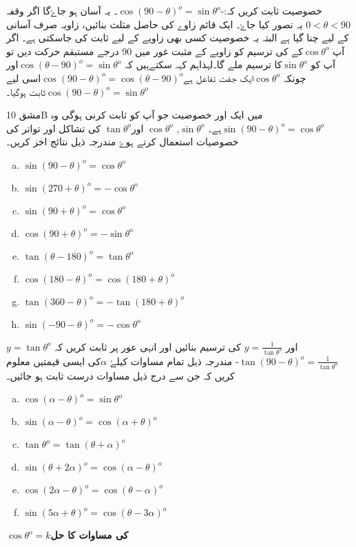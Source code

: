 خصوصیت ثابت کریں کہ:-\( \cos (90- \theta)^o=\sin \theta^o\)۔
یہ آسان ہو جاۓگا اگر وقفہ\(0<\theta <90\) یہ تصور کیا جاۓ۔ ایک قائم زاوے کی حاصل مثلث بنائیں، زاویہ صرف آسانی کے لیے چنا گیا ہے البتہ یہ خصوصیت کسی بھی زاویے کے لیے ثابت کی جاسکتی ہے۔
اگر آپ \(\cos \theta^o\)کے کی ترسیم کو زاویے کے مثبت غور میں 90 درجے مستبقم حرکت دیں تو آپ کو \(\sin \theta^o\)کا ترسیم ملے گا۔لہذاہم کہہ سکتےہیں کہ \( \cos (\theta-90)^o=\sin \theta^o\)اور چونکہ \(\cos \theta^o\)ایک جفت تفاعل ہے\(\cos (90- \theta)^o=\cos (\theta-90)^o\)اسی لیے \(\cos (90- \theta)^o=\sin \theta^o\)ثابت ہوگیا۔

مشق 10B میں ایک اور خصوصیت جو آپ کو ثابت کرنی ہوگی وہ \(\sin (90- \theta)^o=\cos \theta^o\)ہے۔
\(\sin \theta^o\), \(\cos \theta^o\) اور\(\tan \theta^o\) کی تشاکل اور تواتر کی خصوصیات استعمال کرتے ہوۓ مندرجہ ذیل نتائج اخز کریں۔
\begin{multicols}{2}
\begin{enumerate}[a.]
\item \(\sin (90 -\theta)^o =\cos \theta^o\)
\item \(\sin (270 +\theta)^o =-\cos \theta^o\)
\item \(\sin (90 +\theta)^o =\cos \theta^o\)
\item \(\cos (90 +\theta)^o =-\sin \theta^o\)
\item \(\tan (\theta-180)^o =\tan \theta^o\)
\item \(\cos (180 -\theta)^o =\cos (180+ \theta)^o\)
\item \(\tan (360 -\theta)^o =-\tan (180+ \theta)^o\)
\item \(\sin (-90 -\theta)^o =-\cos \theta^o\)
\end{enumerate}
\end{multicols}
\(y= \tan \theta^o\)
اور \(y=\frac{1}{\tan \theta^o}\) کی ترسیم بنائیں اور انہی عور پر ثابت کریں کہ\(\tan (90 -\theta)^o=\frac{1}{\tan \theta^o}\)-
مندرجہ ذیل تمام مساوات کیلۓ \(\alpha\)کی ایسی قیمتیں معلوم کریں کہ جن سے درج ذیل مساوات درست ثابت ہو جائیں۔


\begin{multicols}{2}
\begin{enumerate}[a.]
\item \(\cos (\alpha -\theta)^o =\sin \theta^o\)
\item \(\sin (\alpha -\theta)^o =\cos (\alpha+\theta)^o\)
\item \(\tan \theta^o =\tan (\theta + \alpha)^o\)
\item \(\sin (\theta +2 \alpha)^o =\cos (\alpha -\theta)^o\)
\item \(\cos (2\alpha -\theta)^o =\cos (\theta -\alpha)^o\)
\item \(\sin (5\alpha +\theta)^o =\cos ( \theta -3\alpha)^o\)
\end{enumerate}
\end{multicols}
\textbf{\(\cos \theta^o = k\)کی مساوات کا حل}


